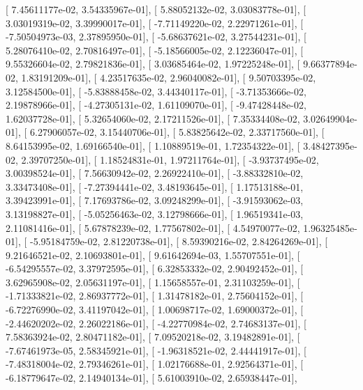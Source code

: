 \documentclass{article}
\begin{document}
       [  7.45611177e-02,   3.54335967e-01],
       [  5.88052132e-02,   3.03083778e-01],
       [  3.03019319e-02,   3.39990017e-01],
       [ -7.71149220e-02,   2.22971261e-01],
       [ -7.50504973e-03,   2.37895950e-01],
       [ -5.68637621e-02,   3.27544231e-01],
       [  5.28076410e-02,   2.70816497e-01],
       [ -5.18566005e-02,   2.12236047e-01],
       [  9.55326604e-02,   2.79821836e-01],
       [  3.03685464e-02,   1.97225248e-01],
       [  9.66377894e-02,   1.83191209e-01],
       [  4.23517635e-02,   2.96040082e-01],
       [  9.50703395e-02,   3.12584500e-01],
       [ -5.83888458e-02,   3.44340117e-01],
       [ -3.71353666e-02,   2.19878966e-01],
       [ -4.27305131e-02,   1.61109070e-01],
       [ -9.47428448e-02,   1.62037728e-01],
       [  5.32654060e-02,   2.17211526e-01],
       [  7.35334408e-02,   3.02649904e-01],
       [  6.27906057e-02,   3.15440706e-01],
       [  5.83825642e-02,   2.33717560e-01],
       [  8.64153995e-02,   1.69166540e-01],
       [  1.10889519e-01,   1.72354322e-01],
       [  3.48427395e-02,   2.39707250e-01],
       [  1.18524831e-01,   1.97211764e-01],
       [ -3.93737495e-02,   3.00398524e-01],
       [  7.56630942e-02,   2.26922410e-01],
       [ -3.88332810e-02,   3.33473408e-01],
       [ -7.27394441e-02,   3.48193645e-01],
       [  1.17513188e-01,   3.39423991e-01],
       [  7.17693786e-02,   3.09248299e-01],
       [ -3.91593062e-03,   3.13198827e-01],
       [ -5.05256463e-02,   3.12798666e-01],
       [  1.96519341e-03,   2.11081416e-01],
       [  5.67878239e-02,   1.77567802e-01],
       [  4.54970077e-02,   1.96325485e-01],
       [ -5.95184759e-02,   2.81220738e-01],
       [  8.59390216e-02,   2.84264269e-01],
       [  9.21646521e-02,   2.10693801e-01],
       [  9.61642694e-03,   1.55707551e-01],
       [ -6.54295557e-02,   3.37972595e-01],
       [  6.32853332e-02,   2.90492452e-01],
       [  3.62965908e-02,   2.05631197e-01],
       [  1.15658557e-01,   2.31103259e-01],
       [ -1.71333821e-02,   2.86937772e-01],
       [  1.31478182e-01,   2.75604152e-01],
       [ -6.72276990e-02,   3.41197042e-01],
       [  1.00698717e-02,   1.69000372e-01],
       [ -2.44620202e-02,   2.26022186e-01],
       [ -4.22770984e-02,   2.74683137e-01],
       [  7.58363924e-02,   2.80471182e-01],
       [  7.09520218e-02,   3.19482891e-01],
       [ -7.67461973e-05,   2.58345921e-01],
       [ -1.96318521e-02,   2.44441917e-01],
       [ -7.48318004e-02,   2.79346261e-01],
       [  1.02176688e-01,   2.92564371e-01],
       [ -6.18779647e-02,   2.14940134e-01],
       [  5.61003910e-02,   2.65938447e-01],
\end{document}
